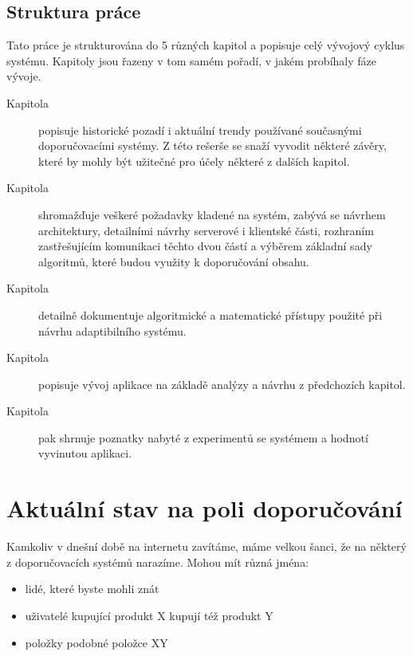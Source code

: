\documentclass[thesis=M,czech]{FITthesis}[2014/05/07]
\begin{document}
\begin{introduction}
\section{Struktura práce}
\label{sec:structure}
	Tato práce je strukturována do 5 různých kapitol a popisuje celý vývojový cyklus systému. Kapitoly jsou řazeny v tom samém pořadí, v jakém probíhaly fáze vývoje.	

\begin{description}
  \item[Kapitola]  popisuje historické pozadí i aktuální trendy používané současnými doporučovacími systémy. Z této rešerše se snaží vyvodit některé závěry, které by mohly být užitečné pro účely některé z dalších kapitol.
  \item[Kapitola]  shromažďuje veškeré požadavky kladené na systém, zabývá se návrhem architektury, detailními návrhy serverové i klientské části, rozhraním zastřešujícím komunikaci těchto dvou částí a výběrem základní sady algoritmů, které budou využity k doporučování obsahu. 
  \item[Kapitola]  detailně dokumentuje algoritmické a matematické přístupy použité při návrhu adaptibilního systému. 
  \item[Kapitola]  popisuje vývoj aplikace na základě analýzy a návrhu z předchozích kapitol. 
  \item[Kapitola]  pak shrnuje poznatky nabyté z experimentů se systémem a hodnotí vyvinutou aplikaci. 
\end{description}
	
\end{introduction}
	
\chapter{Aktuální stav na poli doporučování}	
\label{chap:current}

Kamkoliv v dnešní době na internetu zavítáme, máme velkou šanci, že na některý z doporučovacích systémů narazíme. Mohou mít různá jména:

\begin{itemize}
	\item lidé, které byste mohli znát
	\item uživatelé kupující produkt X kupují též produkt Y
	\item položky podobné položce XY	
\end{itemize}
\end{document}

